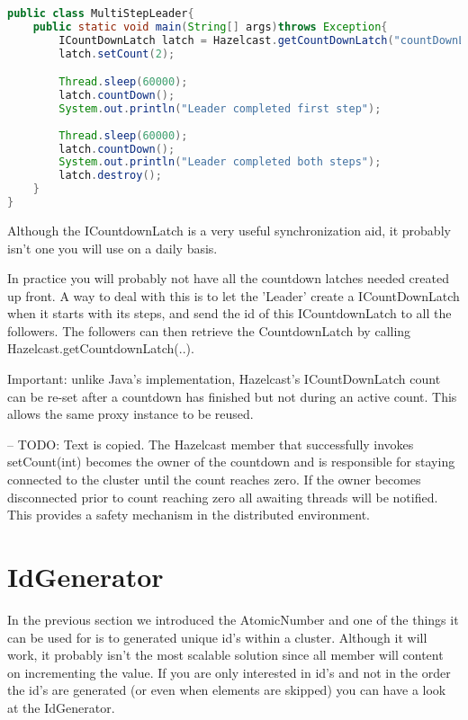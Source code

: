\begin{lstlisting}[language=java]
public class MultiStepLeader{
    public static void main(String[] args)throws Exception{
        ICountDownLatch latch = Hazelcast.getCountDownLatch("countDownLatch");
        latch.setCount(2);

        Thread.sleep(60000); 
        latch.countDown();
        System.out.println("Leader completed first step");
        
        Thread.sleep(60000); 
        latch.countDown();
        System.out.println("Leader completed both steps");
        latch.destroy();
    }
}
\end{lstlisting}

Although the ICountdownLatch is a very useful synchronization aid, it probably isn't one you will use on a daily basis.

In practice you will probably not have all the countdown latches needed created up front. A way to deal with this is to let the 'Leader' create a ICountDownLatch when it starts with its steps, and send the id of this ICountdownLatch to all the followers. The followers can then retrieve the CountdownLatch by calling Hazelcast.getCountdownLatch(..).

Important: unlike Java's implementation, Hazelcast's ICountDownLatch count can be re-set after a countdown has finished but not during an active count. This allows the same proxy instance to be reused.

-- TODO: Text is copied.
The Hazelcast member that successfully invokes setCount(int) becomes the owner of the countdown and is responsible for staying connected to the cluster until the count reaches zero. If the owner  becomes disconnected prior to count reaching zero all awaiting threads will be notified. This provides a safety mechanism in the distributed environment.

\section{IdGenerator}

In the previous section we introduced the AtomicNumber and one of the things it can be used for is to generated unique id's within a cluster. Although it will work, it probably isn't the most scalable solution since all member will content on incrementing the value. If you are only interested in id's and not in the order the id's are generated (or even when elements are skipped) you can have a look at the IdGenerator.

